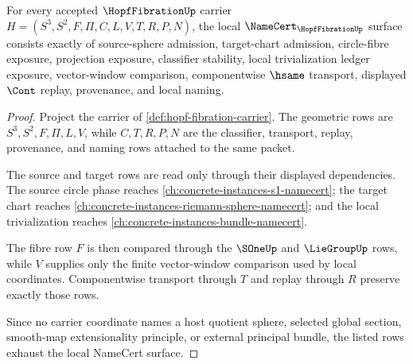\begin{theorem}
\label{thm:hopf-fibration-namecert-obligations}
For every accepted $\HopfFibrationUp$ carrier $H=(S^{3},S^{2},F,\Pi,C,L,V,T,R,P,N)$, the local $\NameCert_{\HopfFibrationUp}$ surface consists exactly of source-sphere admission, target-chart admission, circle-fibre exposure, projection exposure, classifier stability, local trivialization ledger exposure, vector-window comparison, componentwise $\hsame$ transport, displayed $\Cont$ replay, provenance, and local naming.
\end{theorem}
\begin{proof}
Project the carrier of \autoref{def:hopf-fibration-carrier}. The geometric rows are $S^{3},S^{2},F,\Pi,L,V$, while $C,T,R,P,N$ are the classifier, transport, replay, provenance, and naming rows attached to the same packet.

The source and target rows are read only through their displayed dependencies. The source circle phase reaches \autoref{ch:concrete-instances-s1-namecert}; the target chart reaches \autoref{ch:concrete-instances-riemann-sphere-namecert}; and the local trivialization reaches \autoref{ch:concrete-instances-bundle-namecert}.

The fibre row $F$ is then compared through the $\SOneUp$ and $\LieGroupUp$ rows, while $V$ supplies only the finite vector-window comparison used by local coordinates. Componentwise transport through $T$ and replay through $R$ preserve exactly those rows.

Since no carrier coordinate names a host quotient sphere, selected global section, smooth-map extensionality principle, or external principal bundle, the listed rows exhaust the local NameCert surface.
\end{proof}

